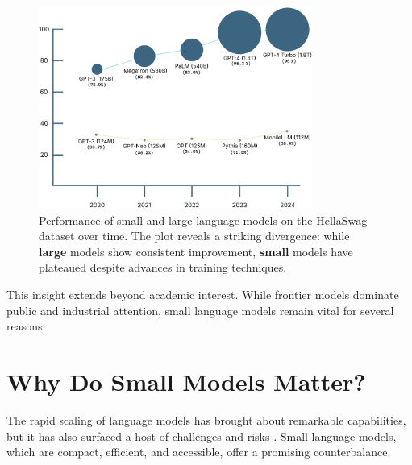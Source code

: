 \begin{figure}[htbp]
    \centering
    \includegraphics[width=0.8\textwidth]{chapters/introduction/figures/lm_performance_comparison.pdf}
    \caption{Performance of small and large language models on the HellaSwag dataset over time. The plot reveals a striking divergence: while \textbf{\textcolor[HTML]{37718E}{large}} models show consistent improvement, \textbf{\textcolor[HTML]{FF7F11}{small}} models have plateaued despite advances in training techniques.}
    \label{fig:model_size_vs_performance}
\end{figure}

This insight extends beyond academic interest. While frontier models dominate public and industrial attention, small language models remain vital for several reasons. %

\section*{Why Do Small Models Matter?}

The rapid scaling of language models has brought about remarkable capabilities, but it has also surfaced a host of challenges and risks \citep{bommasani2021foundation}. Small language models, which are compact, efficient, and accessible, offer a promising counterbalance.

